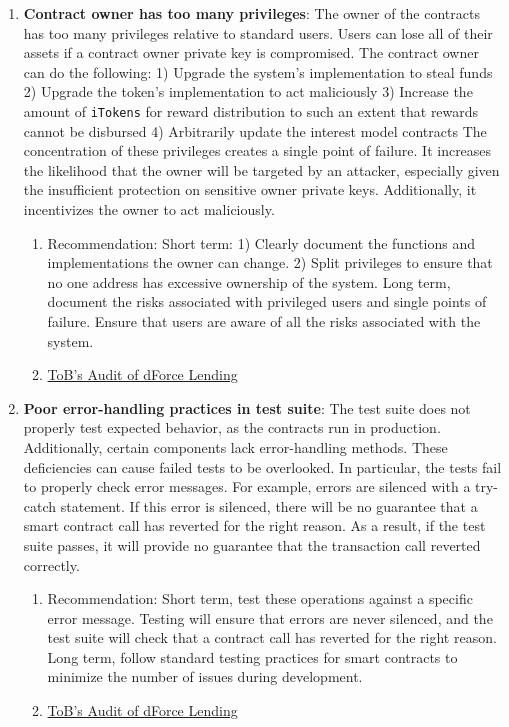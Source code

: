 \begin{enumerate}
\item\textbf{Contract owner has too many privileges}: The owner of the contracts has too many privileges relative to standard users. Users can lose all of their assets if a contract owner private key is compromised. The contract owner can do the following: 1) Upgrade the system’s implementation to steal funds 2) Upgrade the token’s implementation to act maliciously 3) Increase the amount of \verb|iTokens| for reward distribution to such an extent that rewards cannot be disbursed 4) Arbitrarily update the interest model contracts The concentration of these privileges creates a single point of failure. It increases the likelihood that the owner will be targeted by an attacker, especially given the insufficient protection on sensitive owner private keys. Additionally, it incentivizes the owner to act maliciously.
	\begin{enumerate}
	\item Recommendation: Short term: 1) Clearly document the functions and implementations the owner can change. 2) Split privileges to ensure that no one address has excessive ownership of the system. Long term, document the risks associated with privileged users and single points of failure. Ensure that users are aware of all the risks associated with the system.
	\item\href{https://github.com/dforce-network/documents/blob/master/audit\_report/Lending/dForceLending-Audit-Report-TrailofBits-Mar-2021.pdf}{ToB's Audit of dForce Lending}
	\end{enumerate}

\item\textbf{Poor error-handling practices in test suite}: The test suite does not properly test expected behavior, as the contracts run in production. Additionally, certain components lack error-handling methods. These deficiencies can cause failed tests to be overlooked. In particular, the tests fail to properly check error messages. For example, errors are silenced with a try-catch statement. If this error is silenced, there will be no guarantee that a smart contract call has reverted for the right reason. As a result, if the test suite passes, it will provide no guarantee that the transaction call reverted correctly.
	\begin{enumerate}
	\item Recommendation: Short term, test these operations against a specific error message. Testing will ensure that errors are never silenced, and the test suite will check that a contract call has reverted for the right reason. Long term, follow standard testing practices for smart contracts to minimize the number of issues during development.
	\item\href{https://github.com/dforce-network/documents/blob/master/audit\_report/Lending/dForceLending-Audit-Report-TrailofBits-Mar-2021.pdf}{ToB's Audit of dForce Lending}
	\end{enumerate}


\end{enumerate}
